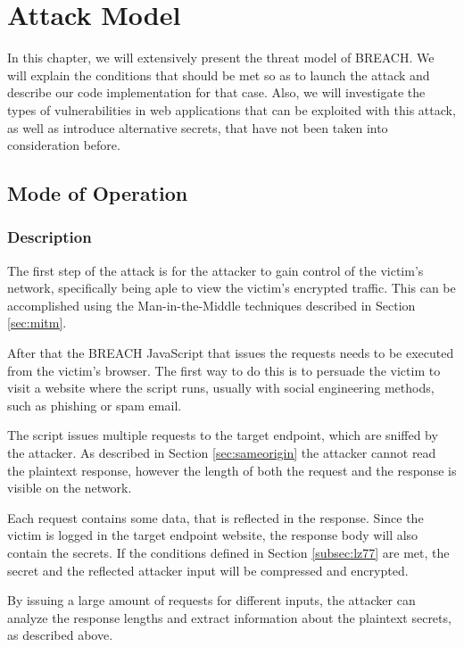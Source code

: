 \chapter{Attack Model}\label{ch:attack}

In this chapter, we will extensively present the threat model of BREACH. We will
explain the conditions that should be met so as to launch the attack and
describe our code implementation for that case. Also, we will investigate the
types of vulnerabilities in web applications that can be exploited with this
attack, as well as introduce alternative secrets, that have not been taken into
consideration before.

\section{Mode of Operation}\label{sec:mo}

\subsection{Description}

The first step of the attack is for the attacker to gain control of the victim's
network, specifically being aple to view the victim's encrypted traffic. This
can be accomplished using the Man-in-the-Middle techniques described in Section
\ref{sec:mitm}.

After that the BREACH JavaScript that issues the requests needs to be executed
from the victim's browser. The first way to do this is to persuade the victim to
visit a website where the script runs, usually with social engineering methods,
such as phishing or spam email.

The script issues multiple requests to the target endpoint, which are sniffed by
the attacker. As described in Section \ref{sec:sameorigin} the attacker cannot
read the plaintext response, however the length of both the request and the
response is visible on the network.

Each request contains some data, that is reflected in the response. Since the
victim is logged in the target endpoint website, the response body will also
contain the secrets. If the conditions defined in Section \ref{subsec:lz77} are
met, the secret and the reflected attacker input will be compressed and
encrypted.

By issuing a large amount of requests for different inputs, the attacker can
analyze the response lengths and extract information about the plaintext
secrets, as described above.

